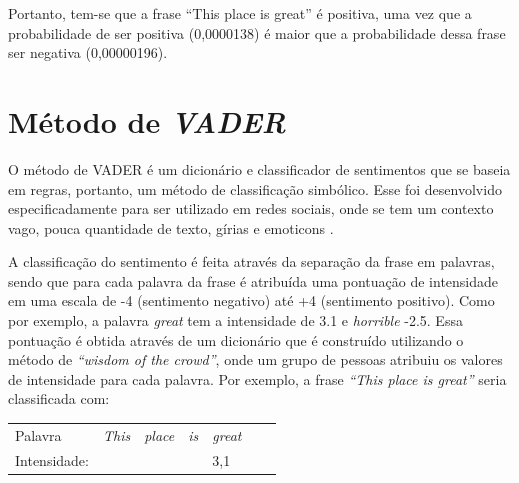 Portanto, tem-se que a frase ``This place is great'' é positiva, uma vez que a
probabilidade de ser positiva (0,0000138) é maior que a probabilidade dessa
frase ser negativa (0,00000196).

\section{Método de \textit{VADER}}

O método de \ac{VADER} é um dicionário e classificador de sentimentos que se
baseia em regras, portanto, um método de classificação simbólico. Esse foi desenvolvido
especificadamente para ser utilizado em redes sociais, onde se tem um contexto
vago, pouca quantidade de texto, gírias e emoticons \cite{conf/icwsm/HuttoG14}.

A classificação do sentimento é feita através da separação da frase em palavras,
sendo que para cada palavra da frase é atribuída uma pontuação de intensidade em
uma escala de -4 (sentimento negativo) até +4 (sentimento positivo). Como por
exemplo, a palavra \textit{great} tem a intensidade de 3.1 e \textit{horrible} -2.5. Essa pontuação é obtida através de
um dicionário que é construído utilizando o método de \textit{``wisdom of the
crowd''}, onde um grupo de pessoas atribuiu os valores de intensidade para cada
palavra. Por exemplo, a frase \textit{``This place is great''} seria classificada com:


\begin{table}[htb]
\centering
\begin{tabular}{l|l|l|l|l|l|l}
Palavra         & \textit{This}        & \textit{place} & \textit{is}      &
\textit{great}
\\
Intensidade:   &  &   &  & 3,1
\end{tabular}
\label{my-label}
\end{table}

